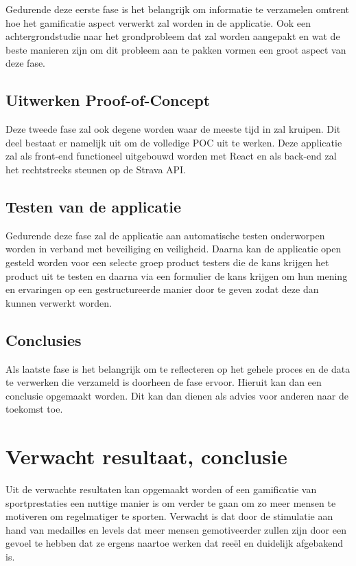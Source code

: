 Gedurende deze eerste fase is het belangrijk om informatie te verzamelen omtrent hoe het gamificatie aspect verwerkt zal worden in de applicatie. Ook een achtergrondstudie naar het grondprobleem dat zal worden aangepakt en wat de beste manieren zijn om dit probleem aan te pakken vormen een groot aspect van deze fase. \\

\subsection{Uitwerken Proof-of-Concept}
\label{subsub:uitwerking}

Deze tweede fase zal ook degene worden waar de meeste tijd in zal kruipen. Dit deel bestaat er namelijk uit om de volledige POC uit te werken. Deze applicatie zal als front-end functioneel uitgebouwd worden met React en als back-end zal het rechtstreeks steunen op de Strava API. 

\subsection{Testen van de applicatie}
\label{subsub:testfase}

Gedurende deze fase zal de applicatie aan automatische testen onderworpen worden in verband met beveiliging en veiligheid. Daarna kan de applicatie open gesteld worden voor een selecte groep product testers die de kans krijgen het product uit te testen en daarna via een formulier de kans krijgen om hun mening en ervaringen op een gestructureerde manier door te geven zodat deze dan kunnen verwerkt worden. 

\subsection{Conclusies}
\label{subsub:conclusies}

Als laatste fase is het belangrijk om te reflecteren op het gehele proces en de data te verwerken die verzameld is doorheen de fase ervoor. Hieruit kan dan een conclusie opgemaakt worden. Dit kan dan dienen als advies voor anderen naar de toekomst toe. 



\section{Verwacht resultaat, conclusie}%
\label{sec:verwachte_resultaten}

Uit de verwachte resultaten kan opgemaakt worden of een gamificatie van sportprestaties een nuttige manier is om verder te gaan om zo meer mensen te motiveren om regelmatiger te sporten. Verwacht is dat door de stimulatie aan hand van medailles en levels dat meer mensen gemotiveerder zullen zijn door een gevoel te hebben dat ze ergens naartoe werken dat reeël en duidelijk afgebakend is.
